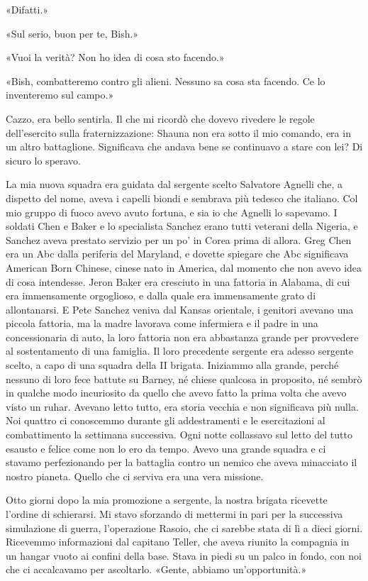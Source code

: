 «Difatti.»

«Sul serio, buon per te, Bish.»

«Vuoi la verità? Non ho idea di cosa sto facendo.»

«Bish, combatteremo contro gli alieni. Nessuno sa cosa sta facendo. Ce
lo inventeremo sul campo.»

Cazzo, era bello sentirla. Il che mi ricordò che dovevo rivedere le
regole dell'esercito sulla fraternizzazione: Shauna non era sotto il mio
comando, era in un altro battaglione. Significava che andava bene se
continuavo a stare con lei? Di sicuro lo speravo.

\hfill\break

La mia nuova squadra era guidata dal sergente scelto Salvatore Agnelli
che, a dispetto del nome, aveva i capelli biondi e sembrava più tedesco
che italiano. Col mio gruppo di fuoco avevo avuto fortuna, e sia io che
Agnelli lo sapevamo. I soldati Chen e Baker e lo specialista Sanchez
erano tutti veterani della Nigeria, e Sanchez aveva prestato servizio
per un po' in Corea prima di allora. Greg Chen era un Abc dalla
periferia del Maryland, e dovette spiegare che Abc significava American
Born Chinese, cinese nato in America, dal momento che non avevo idea di
cosa intendesse. Jeron Baker era cresciuto in una fattoria in Alabama,
di cui era immensamente orgoglioso, e dalla quale era immensamente grato
di allontanarsi. E Pete Sanchez veniva dal Kansas orientale, i genitori
avevano una piccola fattoria, ma la madre lavorava come infermiera e il
padre in una concessionaria di auto, la loro fattoria non era abbastanza
grande per provvedere al sostentamento di una famiglia. Il loro
precedente sergente era adesso sergente scelto, a capo di una squadra
della II brigata. Iniziammo alla grande, perché nessuno di loro fece
battute su Barney, né chiese qualcosa in proposito, né sembrò in qualche
modo incuriosito da quello che avevo fatto la prima volta che avevo
visto un ruhar. Avevano letto tutto, era storia vecchia e non
significava più nulla. Noi quattro ci conoscemmo durante gli
addestramenti e le esercitazioni al combattimento la settimana
successiva. Ogni notte collassavo sul letto del tutto esausto e felice
come non lo ero da tempo. Avevo una grande squadra e ci stavamo
perfezionando per la battaglia contro un nemico che aveva minacciato il
nostro pianeta. Quello che ci serviva era una vera missione.

Otto giorni dopo la mia promozione a sergente, la nostra brigata
ricevette l'ordine di schierarsi. Mi stavo sforzando di mettermi in pari
per la successiva simulazione di guerra, l'operazione Rasoio, che ci
sarebbe stata di lì a dieci giorni. Ricevemmo informazioni dal capitano
Teller, che aveva riunito la compagnia in un hangar vuoto ai confini
della base. Stava in piedi su un palco in fondo, con noi che ci
accalcavamo per ascoltarlo. «Gente, abbiamo un'opportunità.»

